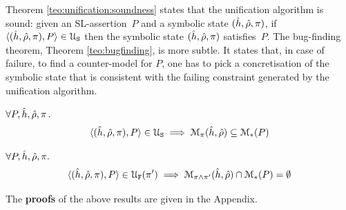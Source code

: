 Theorem \ref{teo:unification:soundness} states that the unification algorithm is sound: given an SL-assertion~$P$ and a 
symbolic state $(\sheap, \sstore, \pc)$, if $\unificationfullP{\sheap, \sstore, \pc}{P}{}$ then the symbolic state
$(\sheap, \sstore, \pc)$ satisfies~$P$. 
The bug-finding theorem, Theorem \ref{teo:bugfinding}, is more subtle. It states that, in case of failure,  to find a counter-model 
for $P$, one has to pick a concretisation of the symbolic state that is consistent with 
the failing constraint generated by the unification algorithm. 



\begin{theorem}\label{teo:unification:soundness}
$\forall P, \sheap, \sstore, \pc \, .$
$$
\begin{array}{l}
   \unificationfullP{\sheap, \sstore, \pc}{P}{}
    \implies \smodels{\sheap, \sstore}{\pc} \subseteq \sepmodels{P}   
\end{array}
$$ 
\end{theorem}


\begin{theorem}\label{teo:bugfinding}
$\forall P, \sheap, \sstore, \pc.$
$$
\unificationfullfailP{\sheap, \sstore, \pc}{P}{\pc'} \implies 
   \smodels{\sheap, \sstore}{\pc \wedge \pc'} \cap \sepmodels{P} = \emptyset
$$ 
\end{theorem}
%
The {\bf proofs} of the above results are given in the Appendix.

%
%



